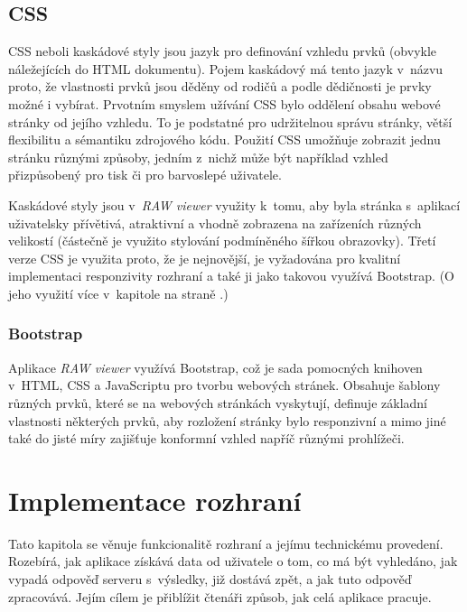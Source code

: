 \documentclass[a4paper, 11pt, oneside, showtrims]{book}
\newcommand{\simplywn}{\textit{RAW viewer} }
\newcommand{\itNameRef}[1]{\textit{\nameref{#1}}}
\begin{document}
			\section{CSS}

				CSS neboli kaskádové styly jsou jazyk pro definování vzhledu prvků (obvykle náležejících do HTML dokumentu). Pojem kaskádový má tento jazyk v~názvu proto, že vlastnosti prvků jsou děděny od rodičů a podle dědičnosti je prvky možné i vybírat. Prvotním smyslem užívání CSS bylo oddělení obsahu webové stránky od jejího vzhledu. To je podstatné pro udržitelnou správu stránky, větší flexibilitu a sémantiku zdrojového kódu. Použití CSS umožňuje zobrazit jednu stránku různými způsoby, jedním z~nichž může být například vzhled přizpůsobený pro tisk či pro barvoslepé uživatele. \parencite{cssWeb}

				Kaskádové styly jsou v~\simplywn využity k~tomu, aby byla stránka s~aplikací uživatelsky přívětivá, atraktivní a vhodně zobrazena na zařízeních různých velikostí (částečně je využito stylování podmíněného šířkou obrazovky). Třetí verze CSS je využita proto, že je nejnovější, je vyžadována pro kvalitní implementaci responzivity rozhraní a také ji jako takovou využívá Bootstrap. (O jeho využití více v~kapitole \itNameRef{cha:bootstrap} na straně \pageref{cha:bootstrap}.) 

				\subsection{Bootstrap}
				\label{cha:bootstrap}

					Aplikace \simplywn využívá Bootstrap, což je sada pomocných knihoven v~HTML, CSS a JavaScriptu pro tvorbu webových stránek. Obsahuje šablony různých prvků, které se na webových stránkách vyskytují, definuje základní vlastnosti některých prvků, aby rozložení stránky bylo responzivní a mimo jiné také do jisté míry zajišťuje konformní vzhled napříč různými prohlížeči. \parencite{bootstrapWeb}

		\chapter{Implementace rozhraní}

			Tato kapitola se věnuje funkcionalitě rozhraní a jejímu technickému provedení. Rozebírá, jak aplikace získává data od uživatele o tom, co má být vyhledáno, jak vypadá odpověď serveru s~výsledky, již dostává zpět, a jak tuto odpověď zpracovává. Jejím cílem je přiblížit čtenáři způsob, jak celá aplikace pracuje.
\end{document}
